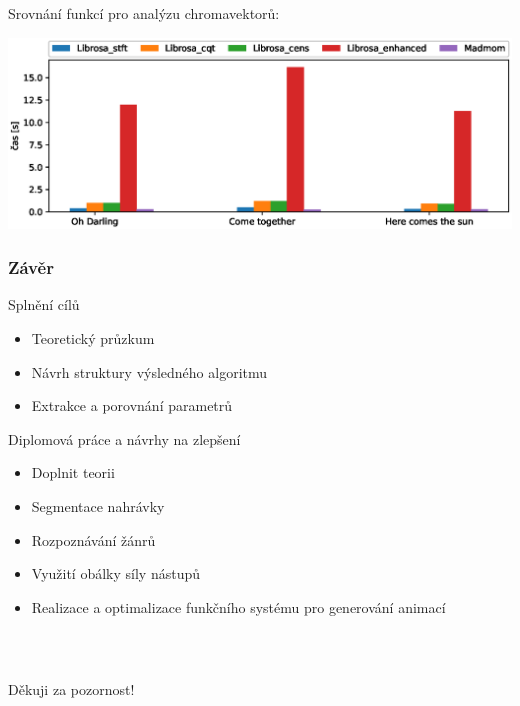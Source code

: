 \documentclass[%
  12pt,       				%
	t,                  %
	aspectratio=1610,   %
	unicode,						%
]{beamer}				    	%
\begin{document}
\begin{frame}
	\frametitle{}
	Srovnání funkcí pro analýzu chromavektorů:

	\vspace{1.3cm}
	\includegraphics[width = 1\columnwidth]{obrazky/Chroma_analysis_times_comparison.eps}

\end{frame}


\begin{frame} 
	\frametitle{Závěr}
	\begin{block}{Splnění cílů}
		\begin{itemize}
			\item Teoretický průzkum
			\item Návrh struktury výsledného algoritmu
			\item Extrakce a porovnání parametrů
		\end{itemize}
	\end{block}
	\begin{block}{Diplomová práce a návrhy na zlepšení}
		\begin{itemize}
			\item Doplnit teorii
			\item Segmentace nahrávky
			\item Rozpoznávání žánrů
			\item Využití obálky síly nástupů
			\item Realizace a optimalizace funkčního systému pro generování animací
		\end{itemize}
	\end{block}
\end{frame}

\begin{frame}[c] 
	\frametitle{\mbox{ }}
	\begin{center}
		{\Huge Děkuji za pozornost!}
	\end{center}
\end{frame}
\end{document}
